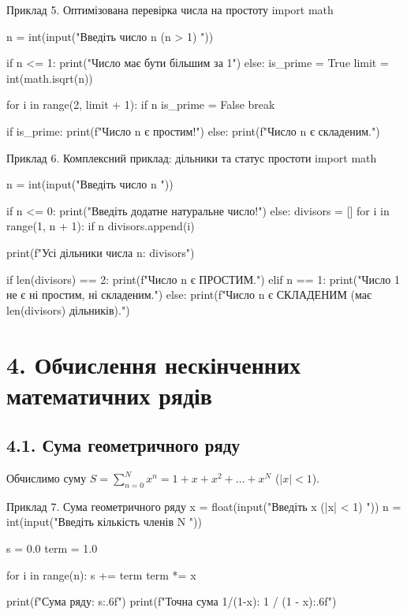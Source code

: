 \documentclass{scrreprt}
\begin{document}
	\begin{py}{Приклад 5. Оптимізована перевірка числа на простоту}
import math

n = int(input("Введіть число n (n > 1) "))

if n <= 1:
    print("Число має бути більшим за 1")
else:
    is_prime = True
    limit = int(math.isqrt(n))
    
    for i in range(2, limit + 1):
        if n %
            is_prime = False
            break

    if is_prime:
        print(f"Число {n} є простим!")
    else:
        print(f"Число {n} є складеним.")
	\end{py}

	\newpage

	\begin{py}{Приклад 6. Комплексний приклад: дільники та статус простоти}
import math

n = int(input("Введіть число n "))

if n <= 0:
    print("Введіть додатне натуральне число!")
else:
    divisors = []
    for i in range(1, n + 1):
        if n %
            divisors.append(i)
    
    print(f"Усі дільники числа {n}: {divisors}")
    
    if len(divisors) == 2:
        print(f"Число {n} є ПРОСТИМ.")
    elif n == 1:
        print("Число 1 не є ні простим, ні складеним.")
    else:
        print(f"Число {n} є СКЛАДЕНИМ (має {len(divisors)} дільників).")
	\end{py}

	\vspace{0.5cm}

	\section*{4. Обчислення нескінченних математичних рядів}

	\subsection*{4.1. Сума геометричного ряду}
	Обчислимо суму $S = \sum_{n=0}^{N} x^n = 1 + x + x^2 + \dots + x^N$ ($|x| < 1$).

	\begin{py}{Приклад 7. Сума геометричного ряду}
x = float(input("Введіть x (|x| < 1) "))
n = int(input("Введіть кількість членів N "))

s = 0.0
term = 1.0

for i in range(n):
    s += term
    term *= x

print(f"Сума ряду: {s:.6f}")
print(f"Точна сума 1/(1-x): {1 / (1 - x):.6f}")
	\end{py}
\end{document}
